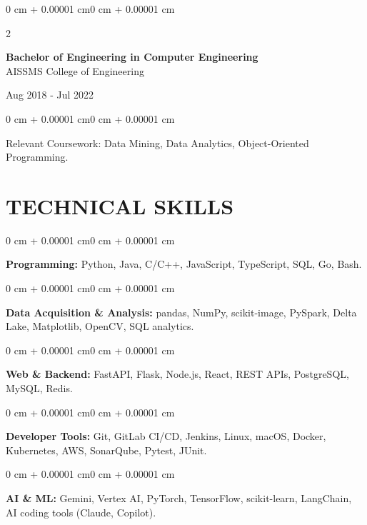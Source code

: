 \documentclass[10pt, letterpaper]{article}
\newenvironment{onecolentry}{
    \begin{adjustwidth}{0 cm + 0.00001 cm}{0 cm + 0.00001 cm}
}{
    \end{adjustwidth}
}
\newenvironment{twocolentry}[2][]{
    \onecolentry
    \def\secondColumn{#2}
    \setcolumnwidth{\fill, 4.5 cm}
    \begin{paracol}{2}
}{
    \switchcolumn \raggedleft \secondColumn
    \end{paracol}
    \endonecolentry
}
\begin{document}
\begin{twocolentry}{
    Aug 2018 - Jul 2022
}
    \textbf{Bachelor of Engineering in Computer Engineering} \\
    AISSMS College of Engineering
\end{twocolentry}
\begin{onecolentry}
Relevant Coursework: Data Mining, Data Analytics, Object-Oriented Programming.
\end{onecolentry}
\section{TECHNICAL SKILLS}
\begin{onecolentry}
\textbf{Programming:} Python, Java, C/C++, JavaScript, TypeScript, SQL, Go, Bash.
\end{onecolentry}
\vspace{0.06 cm}
\begin{onecolentry}
\textbf{Data Acquisition \& Analysis:} pandas, NumPy, scikit-image, PySpark, Delta Lake, Matplotlib, OpenCV, SQL analytics.
\end{onecolentry}
\vspace{0.06 cm}
\begin{onecolentry}
\textbf{Web \& Backend:} FastAPI, Flask, Node.js, React, REST APIs, PostgreSQL, MySQL, Redis.
\end{onecolentry}
\vspace{0.06 cm}
\begin{onecolentry}
\textbf{Developer Tools:} Git, GitLab CI/CD, Jenkins, Linux, macOS, Docker, Kubernetes, AWS, SonarQube, Pytest, JUnit.
\end{onecolentry}
\vspace{0.06 cm}
\begin{onecolentry}
\textbf{AI \& ML:} Gemini, Vertex AI, PyTorch, TensorFlow, scikit-learn, LangChain, AI coding tools (Claude, Copilot).
\end{onecolentry}

\end{document}
